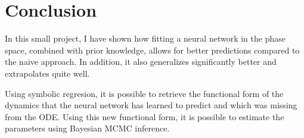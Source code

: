\documentclass[10pt,a4paper]{article}
\begin{document}
\section*{Conclusion}
In this small project, I have shown how fitting a neural network in the phase space,
combined with prior knowledge, allows for better predictions compared to the naive approach.
In addition, it also generalizes significantly better and extrapolates quite well.

Using symbolic regresion, it is possible to retrieve the functional form of the
dynamics that the neural network has learned to predict and which was missing
from the ODE. Using this new functional form, it is possible to estimate the parameters using
Bayesian MCMC inference.
\end{document}
